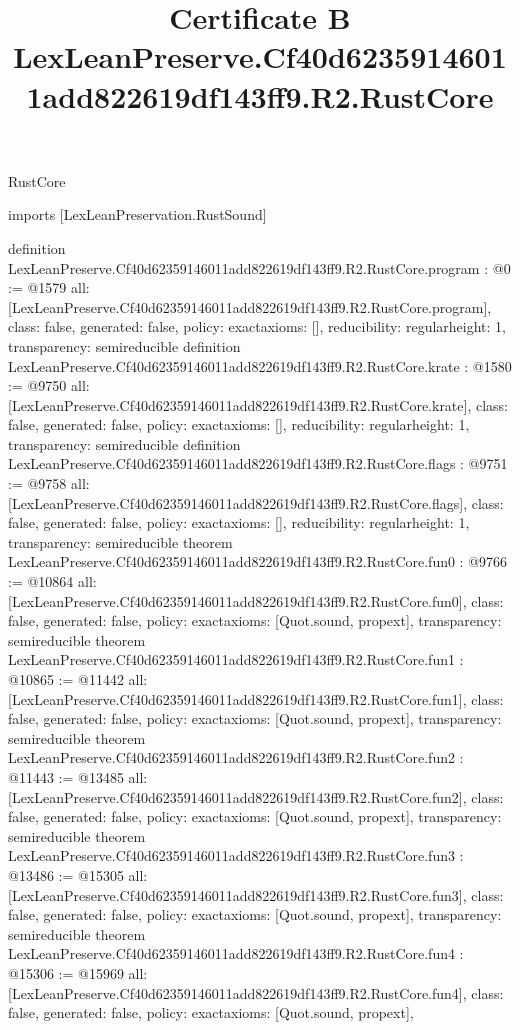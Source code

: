 \begin{lexlean}{RustCore}
\title{Certificate B LexLeanPreserve.Cf40d62359146011add822619df143ff9.R2.RustCore}
\begin{coremodule}
imports [LexLeanPreservation.RustSound]

definition LexLeanPreserve.Cf40d62359146011add822619df143ff9.R2.RustCore.program : @0 := @1579 {
  all: [LexLeanPreserve.Cf40d62359146011add822619df143ff9.R2.RustCore.program],
  class: false,
  generated: false,
  policy: exact{axioms: []},
  reducibility: regular{height: 1},
  transparency: semireducible
}
definition LexLeanPreserve.Cf40d62359146011add822619df143ff9.R2.RustCore.krate : @1580 := @9750 {
  all: [LexLeanPreserve.Cf40d62359146011add822619df143ff9.R2.RustCore.krate],
  class: false,
  generated: false,
  policy: exact{axioms: []},
  reducibility: regular{height: 1},
  transparency: semireducible
}
definition LexLeanPreserve.Cf40d62359146011add822619df143ff9.R2.RustCore.flags : @9751 := @9758 {
  all: [LexLeanPreserve.Cf40d62359146011add822619df143ff9.R2.RustCore.flags],
  class: false,
  generated: false,
  policy: exact{axioms: []},
  reducibility: regular{height: 1},
  transparency: semireducible
}
theorem LexLeanPreserve.Cf40d62359146011add822619df143ff9.R2.RustCore.fun0 : @9766 := @10864 {
  all: [LexLeanPreserve.Cf40d62359146011add822619df143ff9.R2.RustCore.fun0],
  class: false,
  generated: false,
  policy: exact{axioms: [Quot.sound, propext]},
  transparency: semireducible
}
theorem LexLeanPreserve.Cf40d62359146011add822619df143ff9.R2.RustCore.fun1 : @10865 := @11442 {
  all: [LexLeanPreserve.Cf40d62359146011add822619df143ff9.R2.RustCore.fun1],
  class: false,
  generated: false,
  policy: exact{axioms: [Quot.sound, propext]},
  transparency: semireducible
}
theorem LexLeanPreserve.Cf40d62359146011add822619df143ff9.R2.RustCore.fun2 : @11443 := @13485 {
  all: [LexLeanPreserve.Cf40d62359146011add822619df143ff9.R2.RustCore.fun2],
  class: false,
  generated: false,
  policy: exact{axioms: [Quot.sound, propext]},
  transparency: semireducible
}
theorem LexLeanPreserve.Cf40d62359146011add822619df143ff9.R2.RustCore.fun3 : @13486 := @15305 {
  all: [LexLeanPreserve.Cf40d62359146011add822619df143ff9.R2.RustCore.fun3],
  class: false,
  generated: false,
  policy: exact{axioms: [Quot.sound, propext]},
  transparency: semireducible
}
theorem LexLeanPreserve.Cf40d62359146011add822619df143ff9.R2.RustCore.fun4 : @15306 := @15969 {
  all: [LexLeanPreserve.Cf40d62359146011add822619df143ff9.R2.RustCore.fun4],
  class: false,
  generated: false,
  policy: exact{axioms: [Quot.sound, propext]},
}
\end{coremodule}
\end{lexlean}
